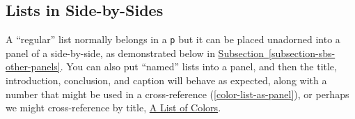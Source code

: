 \documentclass[10pt,]{article}
\theoremstyle{plain}
\theoremstyle{definition}
\theoremstyle{definition}
\theoremstyle{definition}
\theoremstyle{definition}
\theoremstyle{definition}
\theoremstyle{definition}
\numberwithin{equation}{section}
\newlength{\panelmax}
\begin{document}
\subsection[{Lists in Side-by-Sides}]{Lists in Side-by-Sides}\label{subsection-47}
\hypertarget{p-691}{}%
A ``regular'' list normally belongs in a \lstinline?p? but it can be placed unadorned into a panel of a side-by-side, as demonstrated below in \hyperref[subsection-sbs-other-panels]{Subsection~\ref{subsection-sbs-other-panels}}.  You can also put ``named'' lists into a panel, and then the title, introduction, conclusion, and caption will behave as expected, along with a number that might be used in a cross-reference (\hyperref[color-list-as-panel]{\ref{color-list-as-panel}}), or perhaps we might cross-reference by title, \hyperref[color-list-as-panel]{A List of Colors}.%
\begin{figure}
\centering
{%
\setlength{\panelmax}{0pt}
\ifdefined\panelboxAlist\else\newsavebox{\panelboxAlist}\fi%
\ifdefined\phAlist\else\newlength{\phAlist}\fi%
\setlength{\phAlist}{\ht\panelboxAlist+\dp\panelboxAlist}
\settototalheight{\phAlist}{\usebox{\panelboxAlist}}
\setlength{\panelmax}{\maxof{\panelmax}{\phAlist}}
\ifdefined\panelboxBlist\else\newsavebox{\panelboxBlist}\fi%
}
\end{figure}
\end{document}

